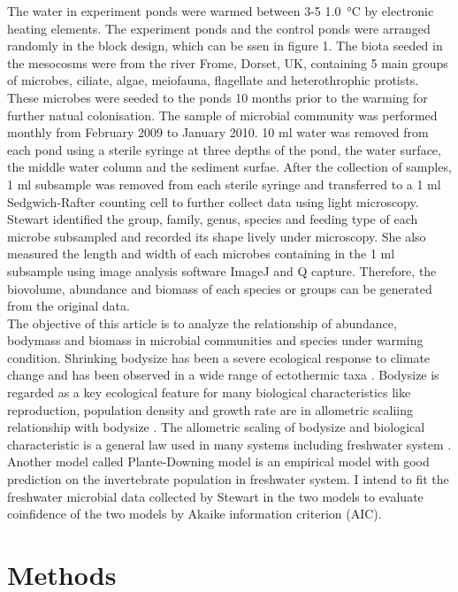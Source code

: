 \documentclass[11pt]{article}
\begin{document}
\begin{linenumbers}
The water in experiment ponds were warmed between 3-5 \SI{1.0}{\celsius} by electronic heating elements.
The experiment ponds and the control ponds were arranged randomly in the block design, which can be ssen in figure 1.
The biota seeded in the mesocosms were from the river Frome, Dorset, UK, containing 5 main groups of microbes, ciliate, algae, meiofauna, flagellate and heterothrophic protists.
These microbes were seeded to the ponds 10 months prior to the warming for further natual colonisation. The sample of microbial community was performed monthly from February 2009 to January 2010.
10 ml water was removed from each pond using a sterile syringe at three depths of the pond, the water surface, the middle water column and the sediment surfae.
After the collection of samples, 1 ml subsample was removed from each sterile syringe and transferred to a 1 ml Sedgwich-Rafter counting cell to further collect data using light microscopy.
Stewart identified the group, family, genus, species and feeding type of each microbe subsampled and recorded its shape lively under microscopy.
She also measured the length and width of each microbes containing in the 1 ml subsample using image analysis software ImageJ and Q capture.
Therefore, the biovolume, abundance and biomass of each species or groups can be generated from the original data. \\
The objective of this article is to analyze the relationship of abundance, bodymass and biomass in microbial communities and species under warming condition.
Shrinking bodysize has been a severe ecological response to climate change and has been observed in a wide range of ectothermic taxa \cite{walters2006temperature}.
Bodysize is regarded as a key ecological feature for many biological characteristics  like reproduction, population density and growth rate are in allometric scaliing relationship with bodysize \cite{peters1983effect}.
The allometric scaling of bodysize and biological characteristic is a general law used in many systems including freshwater system \cite{yvon2011warming}.
Another model called Plante-Downing model is an empirical model with good prediction on the invertebrate population in freshwater system\cite{plante1989production}.
I intend to fit the freshwater microbial data collected by Stewart in the two models to evaluate coinfidence of the two models by Akaike information criterion (AIC).

\section*{Methods}

\end{linenumbers}
\end{document}
